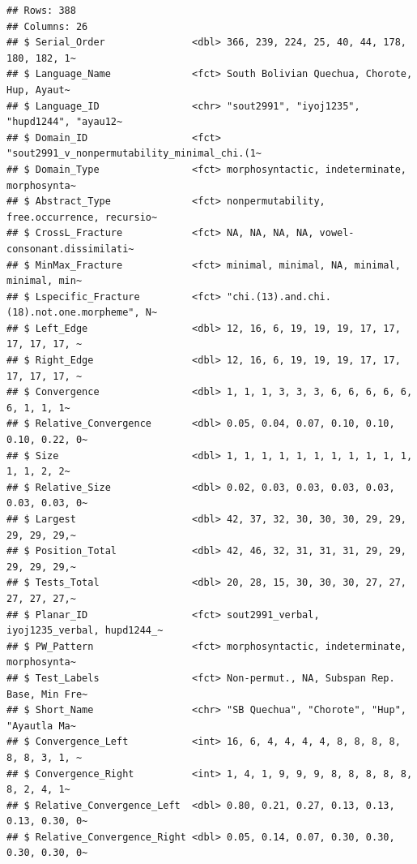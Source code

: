 \documentclass[
]{article}
\begin{document}
\begin{verbatim}
## Rows: 388
## Columns: 26
## $ Serial_Order               <dbl> 366, 239, 224, 25, 40, 44, 178, 180, 182, 1~
## $ Language_Name              <fct> South Bolivian Quechua, Chorote, Hup, Ayaut~
## $ Language_ID                <chr> "sout2991", "iyoj1235", "hupd1244", "ayau12~
## $ Domain_ID                  <fct> "sout2991_v_nonpermutability_minimal_chi.(1~
## $ Domain_Type                <fct> morphosyntactic, indeterminate, morphosynta~
## $ Abstract_Type              <fct> nonpermutability, free.occurrence, recursio~
## $ CrossL_Fracture            <fct> NA, NA, NA, NA, vowel-consonant.dissimilati~
## $ MinMax_Fracture            <fct> minimal, minimal, NA, minimal, minimal, min~
## $ Lspecific_Fracture         <fct> "chi.(13).and.chi.(18).not.one.morpheme", N~
## $ Left_Edge                  <dbl> 12, 16, 6, 19, 19, 19, 17, 17, 17, 17, 17, ~
## $ Right_Edge                 <dbl> 12, 16, 6, 19, 19, 19, 17, 17, 17, 17, 17, ~
## $ Convergence                <dbl> 1, 1, 1, 3, 3, 3, 6, 6, 6, 6, 6, 6, 1, 1, 1~
## $ Relative_Convergence       <dbl> 0.05, 0.04, 0.07, 0.10, 0.10, 0.10, 0.22, 0~
## $ Size                       <dbl> 1, 1, 1, 1, 1, 1, 1, 1, 1, 1, 1, 1, 1, 2, 2~
## $ Relative_Size              <dbl> 0.02, 0.03, 0.03, 0.03, 0.03, 0.03, 0.03, 0~
## $ Largest                    <dbl> 42, 37, 32, 30, 30, 30, 29, 29, 29, 29, 29,~
## $ Position_Total             <dbl> 42, 46, 32, 31, 31, 31, 29, 29, 29, 29, 29,~
## $ Tests_Total                <dbl> 20, 28, 15, 30, 30, 30, 27, 27, 27, 27, 27,~
## $ Planar_ID                  <fct> sout2991_verbal, iyoj1235_verbal, hupd1244_~
## $ PW_Pattern                 <fct> morphosyntactic, indeterminate, morphosynta~
## $ Test_Labels                <fct> Non-permut., NA, Subspan Rep. Base, Min Fre~
## $ Short_Name                 <chr> "SB Quechua", "Chorote", "Hup", "Ayautla Ma~
## $ Convergence_Left           <int> 16, 6, 4, 4, 4, 4, 8, 8, 8, 8, 8, 8, 3, 1, ~
## $ Convergence_Right          <int> 1, 4, 1, 9, 9, 9, 8, 8, 8, 8, 8, 8, 2, 4, 1~
## $ Relative_Convergence_Left  <dbl> 0.80, 0.21, 0.27, 0.13, 0.13, 0.13, 0.30, 0~
## $ Relative_Convergence_Right <dbl> 0.05, 0.14, 0.07, 0.30, 0.30, 0.30, 0.30, 0~
\end{verbatim}
\end{document}
